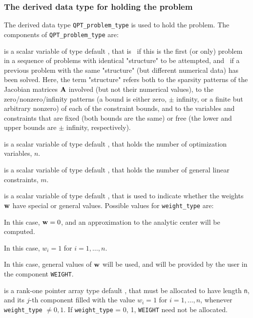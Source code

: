 \documentclass{galahad}
\begin{document}

\subsubsection{The derived data type for holding the problem}\label{typeprob}
The derived data type {\tt QPT\_problem\_type} is used to hold
the problem. The components of
{\tt QPT\_problem\_type}
are:

\begin{description}

 is a scalar variable of type default \logical,
 that is \true\ if this is the first (or only) problem in a sequence of
 problems with identical "structure" to be attempted, and \false\ if
 a previous problem with the same "structure" (but different
 numerical data) has been solved. Here, the term "structure" refers both to
 the sparsity patterns of the Jacobian matrices ${\mathbf{A}}$ involved
 (but not their numerical values), to the zero/nonzero/infinity patterns
 (a bound is either zero, $\pm$ infinity, or a finite but arbitrary
 nonzero) of each of the constraint bounds, and to the variables and constraints
 that are fixed (both bounds are the same) or free (the lower and upper
 bounds are $\pm$ infinity, respectively).

 is a scalar variable of type default \integer,
 that holds the number of optimization variables, $n$.

 is a scalar variable of type default \integer,
 that holds the number of general linear constraints, $m$.

 is a scalar variable of type default \integer,
that is used to indicate whether the weights ${\mathbf{w}}$
have special or general values. Possible values for {\tt weight\_type} are:
\begin{description}
  In this case, ${\mathbf{w}} = 0$, and an approximation to the
  analytic center will be computed.

 In this case, $w_{i} = 1$ for $i = 1, \ldots ,n$.

 In this case, general values of ${\mathbf{w}}$ will be used,
     and will be provided by the user in the component {\tt WEIGHT}.
\end{description}

 is a rank-one pointer array type default \realdp, that
must be allocated to have length {\tt n}, and its $j$-th component
filled with the value $w_{i}  =  1$ for $i = 1, \ldots ,n$,
whenever {\tt weight\_type} $\neq 0, 1$.
If {\tt weight\_type} {= 0, 1}, {\tt WEIGHT} need not be allocated.


\end{description}
\end{document}
